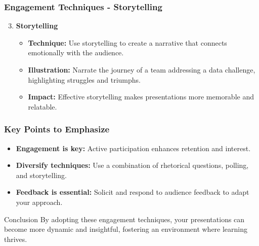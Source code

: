 \documentclass[aspectratio=169]{beamer}
\begin{document}
\begin{frame}[fragile]
    \frametitle{Engagement Techniques - Storytelling}
    \begin{enumerate}
        \setcounter{enumi}{2}
        \item \textbf{Storytelling}
            \begin{itemize}
                \item \textbf{Technique:} Use storytelling to create a narrative that connects emotionally with the audience.
                \item \textbf{Illustration:} Narrate the journey of a team addressing a data challenge, highlighting struggles and triumphs.
                \item \textbf{Impact:} Effective storytelling makes presentations more memorable and relatable.
            \end{itemize}
    \end{enumerate}
\end{frame}

\begin{frame}[fragile]
    \frametitle{Key Points to Emphasize}
    \begin{itemize}
        \item \textbf{Engagement is key:} Active participation enhances retention and interest.
        \item \textbf{Diversify techniques:} Use a combination of rhetorical questions, polling, and storytelling.
        \item \textbf{Feedback is essential:} Solicit and respond to audience feedback to adapt your approach.
    \end{itemize}
    
    \begin{block}{Conclusion}
        By adopting these engagement techniques, your presentations can become more dynamic and insightful, fostering an environment where learning thrives.
    \end{block}
\end{frame}
\end{document}
